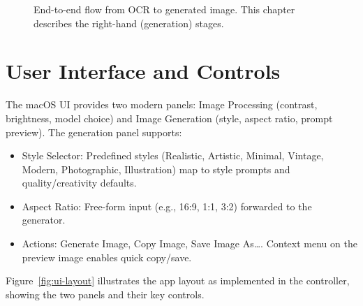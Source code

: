 \begin{figure}[H]
\centering
{}
\caption{End-to-end flow from OCR to generated image. This chapter describes the right-hand (generation) stages.}
\label{fig:gen-flow}
\end{figure}

\section{User Interface and Controls}
The macOS UI provides two modern panels: Image Processing (contrast, brightness, model choice) and Image Generation (style, aspect ratio, prompt preview). The generation panel supports:
\begin{itemize}
    \item Style Selector: Predefined styles (Realistic, Artistic, Minimal, Vintage, Modern, Photographic, Illustration) map to style prompts and quality/creativity defaults.
    \item Aspect Ratio: Free-form input (e.g., 16:9, 1:1, 3:2) forwarded to the generator.
    \item Actions: Generate Image, Copy Image, Save Image As…. Context menu on the preview image enables quick copy/save.
\end{itemize}

Figure~\ref{fig:ui-layout} illustrates the app layout as implemented in the controller, showing the two panels and their key controls.

